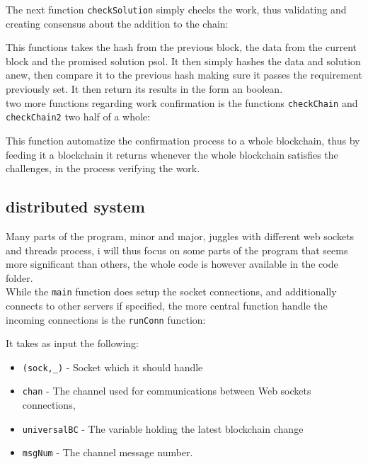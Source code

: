 \documentclass[paper=a4, fontsize=11pt]{scrartcl} %
\numberwithin{equation}{section} %
\numberwithin{figure}{section} %
\numberwithin{table}{section} %
\begin{document}
The next function \texttt{checkSolution} simply checks the work, thus validating and creating consensus about the addition to the chain: 



This functions takes the hash from the previous block, the data from the current block and the promised solution psol. It then simply hashes the data and solution anew, then compare it to the previous hash making sure it passes the requirement previously set. It then return its results in the form an boolean.\\
two more functions regarding work confirmation is the functions \texttt{checkChain} and \texttt{checkChain2} two half of a whole:

 

This function automatize the confirmation process to a whole blockchain, thus by feeding it a blockchain it returns whenever the whole blockchain satisfies the challenges, in the process verifying the work.

\subsection{distributed system}

Many parts of the program, minor and major, juggles with different web sockets and threads process, i will thus focus on some parts of the program that seems more significant than others, the whole code is however available in the code folder.\\

While the \texttt{main} function does setup the socket connections, and additionally connects to other servers if specified, the more central function handle the incoming connections is the \texttt{runConn} function:



It takes as input the following: 
\begin{itemize}
\item \texttt{(sock,\_)} - Socket which it should handle
\item \texttt{chan} - The channel used for communications between Web sockets connections, \item \texttt{universalBC} - The variable holding the latest blockchain change
\item \texttt{msgNum} - The channel message number.  
\end{itemize}
\end{document}
